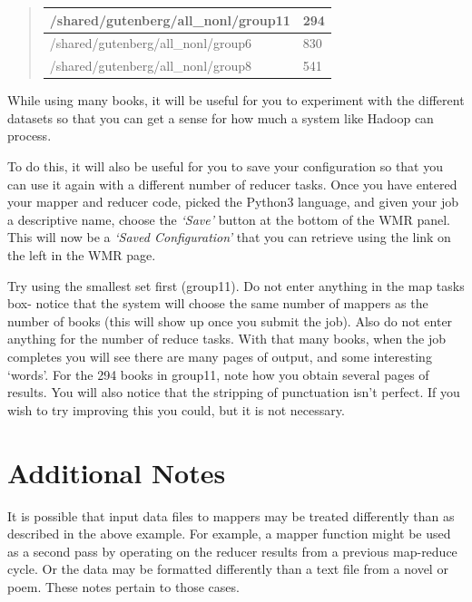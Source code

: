 \documentclass[letterpaper,10pt,openany,oneside]{sphinxmanual}
\begin{document}
\begin{enumerate}
\begin{quote}
\begin{tabulary}{\linewidth}{|L|L|}
/shared/gutenberg/all\_nonl/group11
 & 
294
\\\hline

/shared/gutenberg/all\_nonl/group6
 & 
830
\\\hline

/shared/gutenberg/all\_nonl/group8
 & 
541
\\\hline
\end{tabulary}

\end{quote}

While using many books, it will be useful for you to experiment
with the different datasets so that you can get a sense for how
much a system like Hadoop can process.

To do this, it will also be useful for you to save your
configuration so that you can use it again with a different number
of reducer tasks. Once you have entered your mapper and reducer
code, picked the Python3 language, and given your job a descriptive
name, choose the \emph{`Save'} button at the bottom of the WMR panel.
This will now be a \emph{`Saved Configuration'} that you can retrieve
using the link on the left in the WMR page.

Try using the smallest set first (group11). Do not enter anything
in the map tasks box- notice that the system will choose the same
number of mappers as the number of books (this will show up once
you submit the job). Also do not enter anything for the number of
reduce tasks. With that many books, when the job completes you will
see there are many pages of output, and some interesting `words'.
For the 294 books in group11, note how you obtain several pages of
results. You will also notice that the stripping of punctuation
isn't perfect. If you wish to try improving this you could, but it
is not necessary.

\end{enumerate}


\section{Additional Notes}
\label{wmr_py/wmr_py:additional-notes}
It is possible that input data files to mappers may be treated
differently than as described in the above example. For example, a
mapper function might be used as a second pass by operating on the
reducer results from a previous map-reduce cycle. Or the data may
be formatted differently than a text file from a novel or poem.
These notes pertain to those cases.
\end{document}
